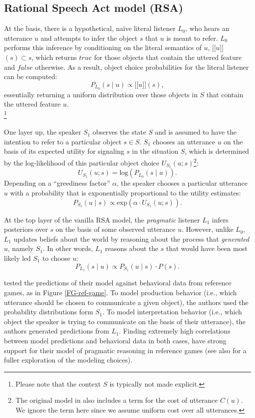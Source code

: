 \documentclass[10pt,a4paper]{article}
\newcommand{\sem}[1]{\mbox{$[\![$#1$]\!]$}}
\begin{document}
\subsection{Rational Speech Act model (RSA)}


At the basis, there is a hypothetical, na\"ive literal listener $L_0$, who hears an utterance $u$ and attempts to infer the object $s$ that $u$ is meant to refer.
$L_0$ performs this inference by conditioning on the literal semantics of $u$, \sem{$u$}$(s)\subset s$, which returns $true$ for those objects that contain the uttered feature and $false$ otherwise.
As a result, object choice probabilities for the literal listener can be computed:  
$$P_{L_{0}}(s\mid u) \propto \sem{$u$}(s),$$
essentially returning a uniform distribution over those objects in $S$ that contain the uttered feature $u$.\\
\footnote{Please note that the context $S$ is typically not made explicit.}


One layer up, the speaker $S_1$ observes the state $S$ and is assumed to have the intention to refer to a particular object $s \in S$.
$S_1$ chooses an utterance $u$ on the basis of its expected utility for signaling $s$ in the situation $S$, which is determined by the log-likelihood of this particular object choice $U_{S_1}(u;s)$\footnote{The original model in  also includes a term for the cost of utterance $C(u)$. We ignore the term here since we assume uniform cost over all utterances.}:
$$U_{S_{1}}(u;s) = \textrm{log}(P_{L_{0}}(s \mid u)).$$ 
Depending on a ``greediness factor'' $\alpha$, the speaker chooses a particular utterance $u$ with a probability that is exponentially proportional to the utility estimates: 
$$P_{S_{1}} (u \mid s) \propto   \textrm{exp}(\alpha \cdot U_{S_{1}} (u;s)).$$

At the top layer of the vanilla RSA model, the \emph{pragmatic} listener $L_1$ infers posteriors over $s$ on the basis of some observed utterance $u$.
However, unlike $L_0$, $L_1$ updates beliefs about the world by reasoning about the process that \emph{generated} $u$, namely $S_1$.
In other words, $L_1$ reasons about the $s$ that would have been most likely led $S_1$ to choose $u$:
$$P_{L_{1}}(s \mid u) \propto P_{S_{1}}(u \mid s) \cdot P(s).$$

 tested the predictions of their model against behavioral data from reference games, as in Figure \ref{FG-ref-game}.
To model production behavior (i.e., which utterance should be chosen to communicate a given object), the authors used the probability distributions form $S_1$.
To model interpretation behavior (i.e., which object the speaker is trying to communicate on the basis of their utterance), the authors generated predictions from $L_1$.
Finding extremely high correlations between model predictions and behavioral data in both cases, \citeauthor{frankgoodman2012} have strong support for their model of pragmatic reasoning in reference games (see also  for a fuller exploration of the modeling choices).
\end{document}

